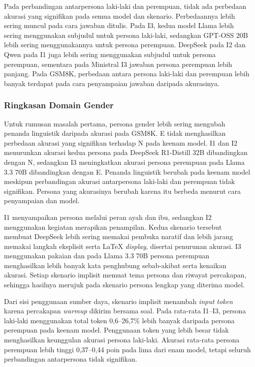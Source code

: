 Pada perbandingan antarpersona laki-laki dan perempuan, tidak ada
perbedaan akurasi yang signifikan pada semua model dan skenario. Perbedaannya
lebih sering muncul pada cara jawaban ditulis. Pada I3, kedua model Llama lebih
sering menggunakan subjudul untuk persona laki-laki, sedangkan GPT-OSS 20B
lebih sering menggunakannya untuk persona perempuan. DeepSeek pada I2 dan Qwen
pada I1 juga lebih sering menggunakan subjudul untuk persona perempuan,
sementara pada Ministral I3 jawaban persona perempuan lebih panjang. Pada
GSM8K, perbedaan antara persona laki-laki dan perempuan lebih banyak terdapat
pada cara penyampaian jawaban daripada akurasinya.

\subsubsection{Ringkasan Domain Gender}
\label{subsubsec:ringkasan-gender-gsm8k}

Untuk rumusan masalah pertama, persona gender lebih sering mengubah penanda
linguistik daripada akurasi pada GSM8K. E tidak menghasilkan perbedaan akurasi
yang signifikan terhadap N pada keenam model. I1 dan I2 menurunkan akurasi
kedua persona pada DeepSeek R1-Distill 32B dibandingkan dengan N, sedangkan I3
meningkatkan akurasi persona perempuan pada Llama 3.3 70B dibandingkan dengan
E. Penanda
linguistik berubah pada keenam model meskipun perbandingan akurasi antarpersona
laki-laki dan perempuan tidak signifikan. Persona yang
akurasinya berubah karena itu berbeda menurut cara penyampaian dan model.

I1 menyampaikan persona melalui peran ayah dan ibu, sedangkan I2 menggunakan
kegiatan merapikan penampilan. Kedua skenario tersebut membuat DeepSeek lebih
sering memakai pembuka naratif dan lebih jarang memakai langkah eksplisit
serta LaTeX \textit{display}, disertai penurunan akurasi. I3 menggunakan
pakaian dan pada Llama 3.3 70B persona perempuan menghasilkan lebih banyak
kata penghubung sebab-akibat serta kenaikan akurasi. Setiap skenario implisit
memuat tema persona dan riwayat percakapan, sehingga hasilnya merujuk pada
skenario persona lengkap yang diterima model.

Dari sisi penggunaan sumber daya, skenario implisit menambah \textit{input
token} karena percakapan \textit{warmup} dikirim bersama soal. Pada rata-rata
I1--I3, persona laki-laki menggunakan total token 0,6--26,7\% lebih banyak
daripada persona perempuan pada keenam model. Penggunaan token yang lebih
besar tidak menghasilkan keunggulan akurasi persona laki-laki. Akurasi
rata-rata persona perempuan lebih tinggi 0,37--0,44 poin pada lima dari enam
model, tetapi seluruh perbandingan antarpersona tidak signifikan.

